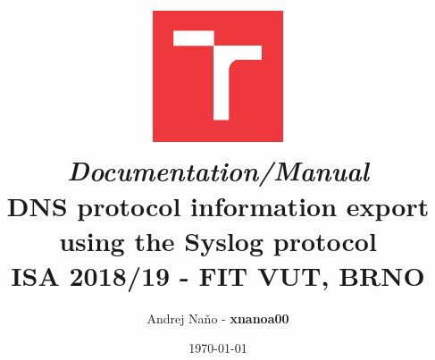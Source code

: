 \documentclass[a4paper,11pt]{article}
\title{\includegraphics[width=4.1cm,keepaspectratio,trim={1.2cm 1.2cm 1.2cm 1.2cm},clip]{vut} \\
\vspace{4cm}
\textit{Documentation/Manual} \\
\textbf{DNS protocol information export using the Syslog protocol}\\
\vspace{0.5cm}
\textsc{ISA 2018/19 - FIT VUT, BRNO}}
\author{Andrej Naňo - \textbf{xnanoa00}}
\date{\today}
\begin{document}
\newpage
\maketitle
\newpage


\renewcommand{\contentsname}{Table of Content}
\tableofcontents







\end{document}
